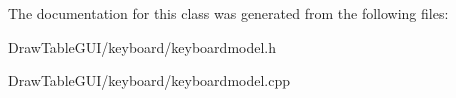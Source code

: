 The documentation for this class was generated from the following files\+:\begin{DoxyCompactItemize}
\item 
Draw\+Table\+G\+U\+I/keyboard/keyboardmodel.\+h\item 
Draw\+Table\+G\+U\+I/keyboard/keyboardmodel.\+cpp\end{DoxyCompactItemize}
